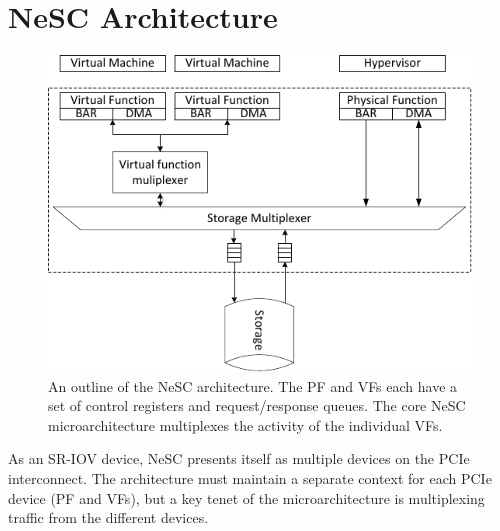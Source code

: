 \chapter{NeSC Architecture}
\label{chap:architecture}


\begin{figure}[ht]
  \centering
  \includegraphics[width=1\columnwidth]{figs/architecture.pdf}
  \caption{An outline of the NeSC architecture. The PF and VFs each have a set of control registers and request/response queues. The core NeSC microarchitecture multiplexes the activity of the individual VFs.}
  \label{fig:architecture}
\end{figure}



%



As an SR-IOV device, NeSC presents itself as multiple devices on the PCIe interconnect. The architecture must maintain a separate context for each PCIe device (PF and VFs), but a key tenet of the microarchitecture is multiplexing traffic from the different devices.

